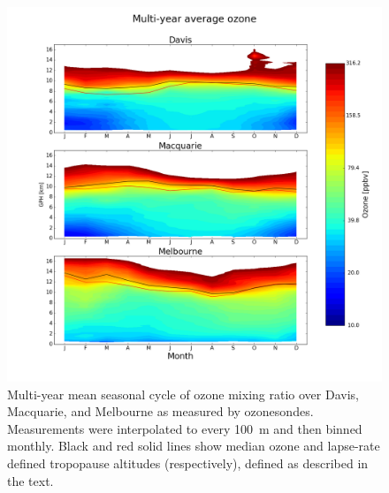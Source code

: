     \begin{figure}[t]
      \includegraphics[width=12.0cm]{figures/seasonaltropozone}
      \caption{ %
	Multi-year mean seasonal cycle of ozone mixing ratio over Davis, Macquarie, and Melbourne as measured by ozonesondes.
	Measurements were interpolated to every 100~m and then binned monthly.
	Black and red solid lines show median ozone and lapse-rate defined tropopause altitudes (respectively), defined as described in the text. }
      \label{fig:seasonaltropozone}
    \end{figure}

